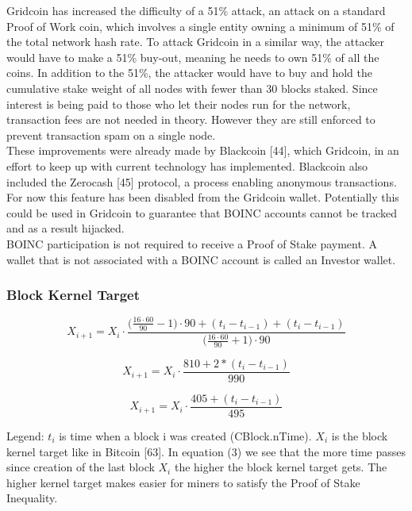 Gridcoin has increased the difficulty of a 51\% attack, an attack on a standard Proof of Work coin, which involves a single entity owning a minimum of 51\% of the total network hash rate. To attack Gridcoin in a similar way, the attacker would have to make a 51\% buy-out, meaning he needs to own 51\% of all the coins. In addition to the 51\%, the attacker would have to buy and hold the cumulative stake weight of all nodes with fewer than 30 blocks staked. Since interest is being paid to those who let their nodes run for the network, transaction fees are not needed in theory. However they are still enforced to prevent transaction spam on a single node.\\

These improvements were already made by Blackcoin [44], which Gridcoin, in an effort to keep up with current technology has implemented. Blackcoin also included the Zerocash [45] protocol, a process enabling anonymous transactions. For now this feature has been disabled from the Gridcoin wallet. Potentially this could be used in Gridcoin to guarantee that BOINC accounts cannot be tracked and as a result hijacked.\\

BOINC participation is not required to receive a Proof of Stake payment. A wallet that is not associated with a BOINC account is called an Investor wallet.

\subsubsection{Block Kernel Target}

\begin{equation}
X_{i+1}=X_i \cdot \frac{\Big( \frac{16 \cdot 60}{90} - 1 \Big) \cdot 90 + (t_{i} - t_{i-1}) + (t_i - t_{i-1})   }{ \Big( \frac{16 \cdot 60}{90} + 1 \Big) \cdot 90} 
\end{equation}

\begin{equation}
X_{i+1}=X_i \cdot \frac{810+2*(t_{i} - t_{i-1})}{990}
\end{equation}

\begin{equation}
X_{i+1}=X_i \cdot \frac{405+(t_{i} - t_{i-1})}{495}
\end{equation}

Legend: $t_i$ is time when a block i was created (CBlock.nTime). $X_i$ is the block kernel target like in Bitcoin [63]. In equation (3) we see that the more time passes since creation of the last block $X_i$ the higher the block kernel target gets. The higher kernel target makes easier for miners to satisfy the Proof of Stake Inequality.

